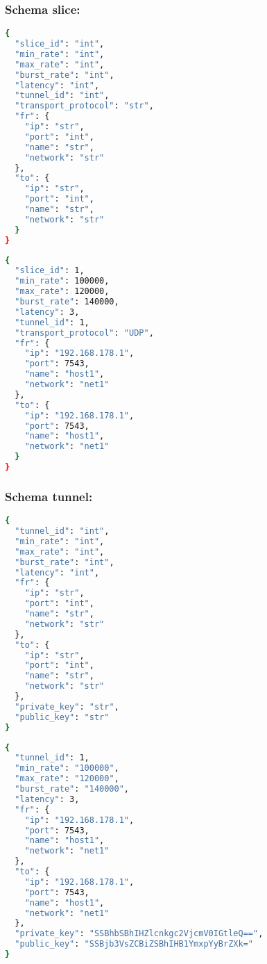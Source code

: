 \subsubsection{Schema slice:}
\label{esmf_slice}
\begin{codes}
\item[Structure] \begin{lstlisting}[language=bash]
{
  "slice_id": "int",
  "min_rate": "int",
  "max_rate": "int",
  "burst_rate": "int",
  "latency": "int",
  "tunnel_id": "int",
  "transport_protocol": "str",
  "fr": {
    "ip": "str",
    "port": "int",
    "name": "str",
    "network": "str"
  },
  "to": {
    "ip": "str",
    "port": "int",
    "name": "str",
    "network": "str"
  }
}
\end{lstlisting}
\end{codes}
\begin{codes}
\item[Example] \begin{lstlisting}[language=bash]
{
  "slice_id": 1,
  "min_rate": 100000,
  "max_rate": 120000,
  "burst_rate": 140000,
  "latency": 3,
  "tunnel_id": 1,
  "transport_protocol": "UDP",
  "fr": {
    "ip": "192.168.178.1",
    "port": 7543,
    "name": "host1",
    "network": "net1"
  },
  "to": {
    "ip": "192.168.178.1",
    "port": 7543,
    "name": "host1",
    "network": "net1"
  }
}
\end{lstlisting}
\end{codes}

\newpage
\subsubsection{Schema tunnel:}
\label{esmf_tunnel}
\begin{codes}
\item[Structure] \begin{lstlisting}[language=bash]
{
  "tunnel_id": "int",
  "min_rate": "int",
  "max_rate": "int",
  "burst_rate": "int",
  "latency": "int",
  "fr": {
    "ip": "str",
    "port": "int",
    "name": "str",
    "network": "str"
  },
  "to": {
    "ip": "str",
    "port": "int",
    "name": "str",
    "network": "str"
  },
  "private_key": "str",
  "public_key": "str"
}
\end{lstlisting}
\end{codes}
\begin{codes}
\item[Example] \begin{lstlisting}[language=bash]
{
  "tunnel_id": 1,
  "min_rate": "100000",
  "max_rate": "120000",
  "burst_rate": "140000",
  "latency": 3,
  "fr": {
    "ip": "192.168.178.1",
    "port": 7543,
    "name": "host1",
    "network": "net1"
  },
  "to": {
    "ip": "192.168.178.1",
    "port": 7543,
    "name": "host1",
    "network": "net1"
  },
  "private_key": "SSBhbSBhIHZlcnkgc2VjcmV0IGtleQ==",
  "public_key": "SSBjb3VsZCBiZSBhIHB1YmxpYyBrZXk="
}
\end{lstlisting}
\end{codes}

\newpage
